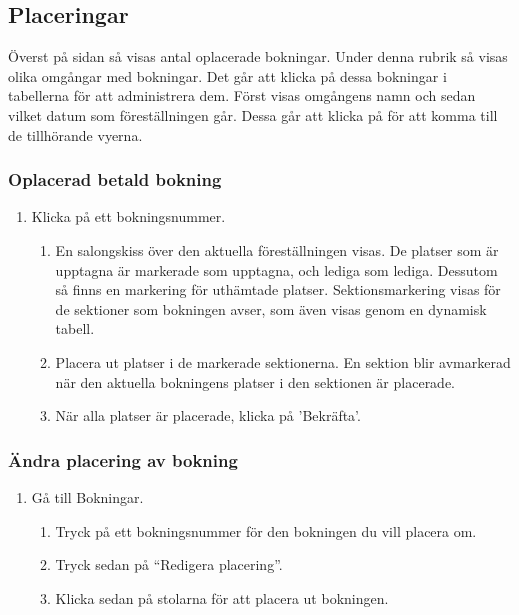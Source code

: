 \documentclass[a4paper, twoside, 11pt, titlepage]{article}
\begin{document}
	\subsection{Placeringar}


	Överst på sidan så visas antal oplacerade bokningar. Under denna rubrik så visas olika omgångar med bokningar. Det går att klicka på dessa bokningar i tabellerna för att administrera dem. Först visas omgångens namn och sedan vilket datum som föreställningen går. Dessa går att klicka på för att komma till de tillhörande vyerna.

		\subsubsection{Oplacerad betald bokning}


		\begin{enumerate}
		\item Klicka på ett bokningsnummer.

		\begin{enumerate}
		\item En salongskiss över den aktuella föreställningen visas. De platser som är upptagna är markerade som upptagna, och lediga som lediga. Dessutom så finns en markering för uthämtade platser. Sektionsmarkering visas för de sektioner som bokningen avser, som även visas genom en dynamisk tabell.

		\item Placera ut platser i de markerade sektionerna. En sektion blir avmarkerad när den aktuella bokningens platser i den sektionen är placerade.

		\item När alla platser är placerade, klicka på 'Bekräfta'.
		\end{enumerate}
		\end{enumerate}

		\subsubsection{Ändra placering av bokning}


		\begin{enumerate}
		\item Gå till Bokningar.

		\begin{enumerate}
		\item Tryck på ett bokningsnummer för den bokningen du vill placera om.

		\item Tryck sedan på ``Redigera placering''.

		\item Klicka sedan på stolarna för att placera ut bokningen.
		\end{enumerate}
		\end{enumerate}
\end{document}
